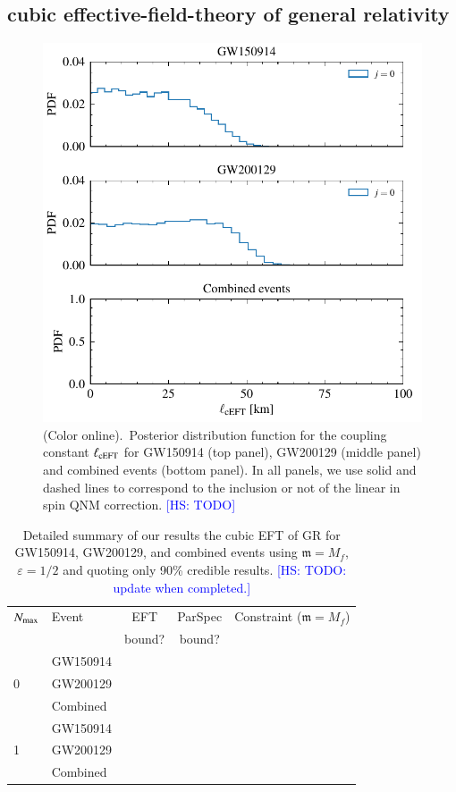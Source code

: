 \documentclass[twocolumn,
               prd,
               aps,
               superscriptaddress,
               tightenlines,
               nofootinbib,
               eqsecnum,
               amsfonts,
               amsmath,
               longbibliography]{revtex4-1}
\newcommand{\gm}{\mathfrak{m}}
\newcommand{\hs}[1]{{\textcolor{blue}{{[HS: #1]}} }}
\begin{document}
\subsection{cubic effective-field-theory of general relativity}
\label{sec:results_ceft}

\begin{figure}[t]
\includegraphics[width=\columnwidth]{figs/ceft_posteriors_combined.pdf}
\caption{(Color online).~Posterior distribution function for the coupling constant $\ell_{\rm cEFT}$ for
GW150914 (top panel), GW200129 (middle panel) and combined events (bottom panel).
%
In all panels, we use solid and dashed lines to correspond to the inclusion or not of the linear
in spin QNM correction.
%
\hs{TODO}
}
\label{fig:cEFT_exec_sum}
\end{figure}

\begin{table}[h]
\begin{tabular}{l l c c c}
\hline
\hline
$N_{\rm max}$ & Event & EFT    & ParSpec & Constraint ($\gm = M_{f}$) \\
              &       & bound? & bound?  &                            \\
\hline
  & GW150914 &  &     &    \\
0 & GW200129 &  &     &    \\
  & Combined &  &     &    \\
\hline
  & GW150914 &  &     &    \\
1 & GW200129 &  &     &    \\
  & Combined &  &     &    \\
\hline
\hline
\end{tabular}
\caption{Detailed summary of our results the cubic EFT of GR for GW150914, GW200129, and
combined events using $\gm = M_{f}$, $\varepsilon = 1/2$ and quoting only 90\% credible results.
%
\hs{TODO: update when completed.}
}
\label{tab:summary_ceft}
\end{table}
\end{document}
